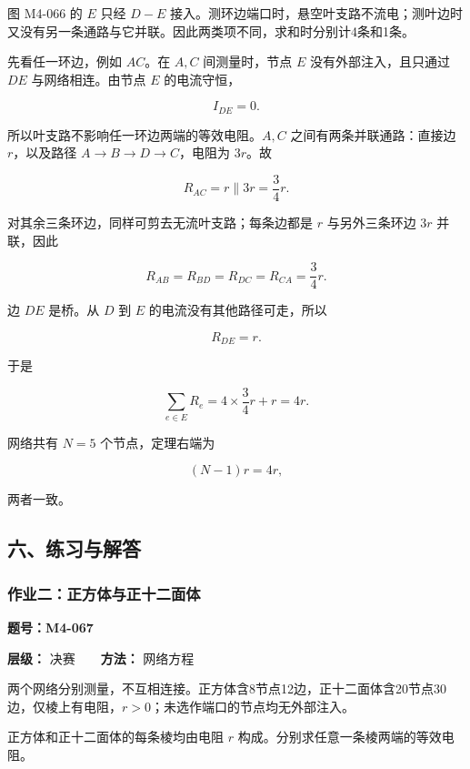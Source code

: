 图 M4-066 的 \(E\) 只经 \(D-E\)
接入。测环边端口时，悬空叶支路不流电；测叶边时又没有另一条通路与它并联。因此两类项不同，求和时分别计4条和1条。

先看任一环边，例如 \(AC\)。在 \(A,C\) 间测量时，节点 \(E\)
没有外部注入，且只通过 \(DE\) 与网络相连。由节点 \(E\) 的电流守恒，

\[
I_{DE}=0.
\]

所以叶支路不影响任一环边两端的等效电阻。\(A,C\)
之间有两条并联通路：直接边 \(r\)，以及路径 \(A\to B\to D\to C\)，电阻为
\(3r\)。故

\[
R_{AC}=r\parallel3r=\frac34r.
\]

对其余三条环边，同样可剪去无流叶支路；每条边都是 \(r\) 与另外三条环边
\(3r\) 并联，因此

\[
R_{AB}=R_{BD}=R_{DC}=R_{CA}=\frac34r.
\]

边 \(DE\) 是桥。从 \(D\) 到 \(E\) 的电流没有其他路径可走，所以

\[
R_{DE}=r.
\]

于是

\[
\sum_{e\in E}R_e
=4\times\frac34r+r
=4r.
\]

网络共有 \(N=5\) 个节点，定理右端为

\[
(N-1)r=4r,
\]

两者一致。

\subsection{六、练习与解答}\label{m4:ux516dux7ec3ux4e60ux4e0eux89e3ux7b54-1}

\par{}
\noindent\begin{minipage}{\linewidth}

\subsubsection{作业二：正方体与正十二面体}\label{m4:ux4f5cux4e1aux4e8cux6b63ux65b9ux4f53ux4e0eux6b63ux5341ux4e8cux9762ux4f53}

\textbf{题号：M4-067}

\textbf{层级：} 决赛　　\textbf{方法：} 网络方程

两个网络分别测量，不互相连接。正方体含8节点12边，正十二面体含20节点30边，仅棱上有电阻，\(r>0\)；未选作端口的节点均无外部注入。

正方体和正十二面体的每条棱均由电阻 \(r\)
构成。分别求任意一条棱两端的等效电阻。

\end{minipage}\par

